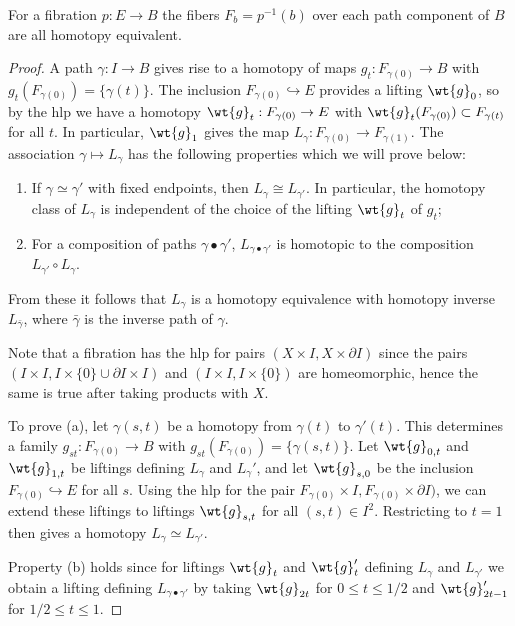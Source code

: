 \begin{prop}\label{prop 4.61 Hatcher}
    For a fibration $p:E\to B$ the fibers $F_b=p^{-1}(b)$ over each path component of $B$ are all homotopy equivalent.
\end{prop} 
\begin{proof}
    A path $\gamma:I\to B$ gives rise to a homotopy of maps $g_t:F_{\gamma(0)}\to B$ with $g_t(F_{\gamma(0)})=\{\gamma(t)\}$. The inclusion $F_{\gamma(0)}\hookrightarrow E$ provides a lifting $\wt{g}_0$, so by the \gls{hlp} we have a homotopy $\wt{g}_t:F_{\gamma(0)}\to E$ with $\wt{g}_t(F_{\gamma(0)})\subset F_{\gamma(t)}$ for all $t$. In particular, $\wt{g}_1$ gives the map $L_\gamma:F_{\gamma(0)}\to F_{\gamma(1)}$. The association $\gamma\mapsto L_\gamma$ has the following properties which we will prove below:
    \begin{enumerate}[label=(\alph*)]
        \item If $\gamma\simeq \gamma '$ with fixed endpoints, then $L_\gamma\cong L_{\gamma'}$. In particular, the homotopy class of $L_\gamma$ is independent of the choice of the lifting $\wt{g}_t$ of $g_t$;
        \item For a composition of paths $\gamma\bullet \gamma'$, $L_{\gamma\bullet\gamma'}$ is homotopic to the composition $L_{\gamma'}\circ L_\gamma$.
    \end{enumerate}
    From these it follows that $L_\gamma$ is a homotopy equivalence with homotopy inverse $L_{\bar\gamma}$, where $\bar\gamma$ is the inverse path of $\gamma$.

    Note that a fibration has the \gls{hlp} for pairs $(X\times I,X\times\partial I)$ since the pairs $(I\times I,I\times\{0\}\cup \partial I\times I)$ and $(I\times I,I\times\{0\})$ are homeomorphic, hence the same is true after taking products with $X$.

    To prove (a), let $\gamma(s,t)$ be a homotopy from $\gamma(t)$ to $\gamma'(t)$. This determines a family $g_{st}:F_{\gamma(0)}\to B$ with $g_{st}(F_{\gamma(0)})=\{\gamma(s,t)\}$. Let $\wt{g}_{0,t}$ and $\wt{g}_{1,t}$ be liftings defining $L_\gamma$ and $L_\gamma'$, and let $\wt{g}_{s,0}$ be the inclusion $F_{\gamma(0)}\hookrightarrow E$ for all $s$. Using the \gls{hlp} for the pair $F_{\gamma(0)}\times I,F_{\gamma(0)}\times\partial I)$, we can extend these liftings to liftings $\wt{g}_{s,t}$ for all $(s,t)\in I^2$. Restricting to $t=1$ then gives a homotopy $L_\gamma \simeq L_{\gamma'}$.

    Property (b) holds since for liftings $\wt{g}_t$ and $\wt{g}_{t}'$ defining $L_\gamma$ and $L_{\gamma'}$ we obtain a lifting defining $L_{\gamma\bullet\gamma'}$ by taking $\wt{g}_{2t}$ for $0\leq t\leq 1/2$ and $\wt{g}_{2t-1}'$ for $1/2\leq t\leq 1$.
\end{proof}

